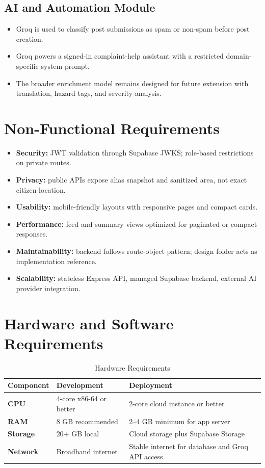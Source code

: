 \documentclass[12pt,a4paper]{report}
\begin{document}
\subsection{AI and Automation Module}
\begin{itemize}
  \item Groq is used to classify post submissions as spam or non-spam before post creation.
  \item Groq powers a signed-in complaint-help assistant with a restricted domain-specific system prompt.
  \item The broader enrichment model remains designed for future extension with translation, hazard tags, and severity analysis.
\end{itemize}

\section{Non-Functional Requirements}
\begin{itemize}
  \item \textbf{Security:} JWT validation through Supabase JWKS; role-based restrictions on private routes.
  \item \textbf{Privacy:} public APIs expose alias snapshot and sanitized area, not exact citizen location.
  \item \textbf{Usability:} mobile-friendly layouts with responsive pages and compact cards.
  \item \textbf{Performance:} feed and summary views optimized for paginated or compact responses.
  \item \textbf{Maintainability:} backend follows route-object pattern; design folder acts as implementation reference.
  \item \textbf{Scalability:} stateless Express API, managed Supabase backend, external AI provider integration.
\end{itemize}

\section{Hardware and Software Requirements}
\begin{table}[H]
\centering
\caption{Hardware Requirements}
\begin{tabularx}{\textwidth}{>{\bfseries}lXX}
\toprule
Component & Development & Deployment \\
\midrule
CPU & 4-core x86-64 or better & 2-core cloud instance or better \\
RAM & 8 GB recommended & 2--4 GB minimum for app server \\
Storage & 20+ GB local & Cloud storage plus Supabase Storage \\
Network & Broadband internet & Stable internet for database and Groq API access \\
\bottomrule
\end{tabularx}
\end{table}
\end{document}
